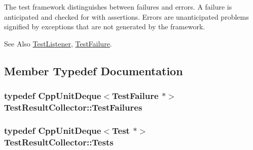 The test framework distinguishes between failures and errors. A failure is anticipated and checked for with assertions. Errors are unanticipated problems signified by exceptions that are not generated by the framework. \begin{DoxySeeAlso}{See Also}
\hyperlink{class_test_listener}{Test\-Listener}, \hyperlink{class_test_failure}{Test\-Failure}. 
\end{DoxySeeAlso}


\subsection{Member Typedef Documentation}
\hypertarget{class_test_result_collector_a8ae051e883095aee10d9f777664fe8af}{
\subsubsection[{Test\-Failures}]{\setlength{\rightskip}{0pt plus 5cm}typedef {\bf Cpp\-Unit\-Deque}$<${\bf Test\-Failure} $\ast$$>$ {\bf Test\-Result\-Collector\-::\-Test\-Failures}}}\label{class_test_result_collector_a8ae051e883095aee10d9f777664fe8af}
\hypertarget{class_test_result_collector_a6ab73f8a52311857afa98a1ef049e30a}{
\subsubsection[{Tests}]{\setlength{\rightskip}{0pt plus 5cm}typedef {\bf Cpp\-Unit\-Deque}$<${\bf Test} $\ast$$>$ {\bf Test\-Result\-Collector\-::\-Tests}}}\label{class_test_result_collector_a6ab73f8a52311857afa98a1ef049e30a}


